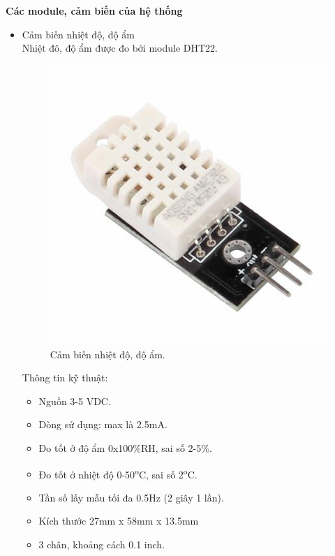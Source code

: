 \documentclass[a4paper,12pt,oneside]{article}
\begin{document}
\noindent \textbf{Các module, cảm biến của hệ thống}
\begin{itemize}

\item Cảm biến nhiệt độ, độ ẩm\\
\noindent Nhiệt đô, độ ẩm được đo bởi module DHT22.
\begin{center}
\begin{figure}[htp]
\begin{center}
\includegraphics[scale=.3]{hinh/DHT22.jpg}
\end{center}
\caption{Cảm biến nhiệt độ, độ ẩm.}

\end{figure}
\end{center}

\noindent Thông tin kỹ thuật:
\begin{itemize}
\item Nguồn 3-5 VDC.
\item Dòng sử dụng: max là 2.5mA.
\item Đo tốt ở độ ẩm 0x100\%RH, sai số 2-5\%.
\item Đo tốt ở nhiệt độ 0-50\textsuperscript{o}C, sai số 2\textsuperscript{o}C.
\item Tần số lấy mẫu tối đa 0.5Hz (2 giây 1 lần).
\item Kích thước 27mm x 58mm x 13.5mm
\item 3 chân, khoảng cách 0.1 inch.
\end{itemize}


\end{itemize}
\end{document}

